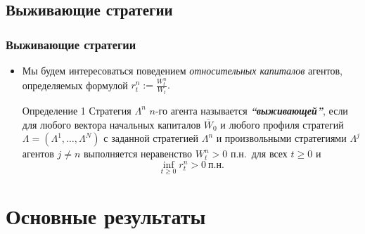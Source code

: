 \documentclass[10pt]{beamer}
\theoremstyle{definition}
\theoremstyle{remark}
\begin{document}
    
 

\subsection{Выживающие стратегии}
\begin{frame}\frametitle{Выживающие стратегии}
    \begin{itemize}
	\item Мы будем интересоваться поведением \textit{относительных капиталов} агентов, определяемых формулой $r_t^n := \frac{W_t^n}{W_t}.$

	\begin{block}{Определение 1}
    Стратегия $\Lambda^n$ $n$-го агента называется \emph{\bf ``выживающей''}, если для любого вектора начальных капиталов $\bar W_0$ и любого профиля стратегий $\Lambda=(\Lambda^1,\ldots,\Lambda^N)$ с заданной стратегией $\Lambda^n$ и произвольными стратегиями $\Lambda^j$ агентов $j\neq n$ выполняется неравенство $W_t^n > 0$ п.н.\ для всех $t\ge 0$ и 
    \[\inf_{t\ge 0} r_t^n > 0\ \text{п.н.} \]
	\end{block}
    \end{itemize}
\end{frame}



\section{Основные результаты}
\end{document}
